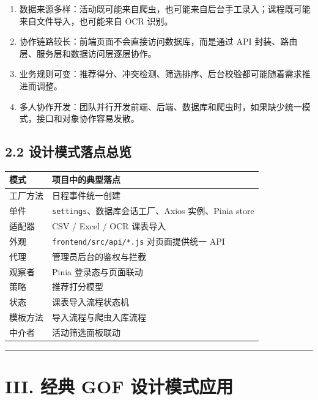 \begin{enumerate}
\def\labelenumi{\arabic{enumi}.}
\tightlist
\item
  数据来源多样：活动既可能来自爬虫，也可能来自后台手工录入；课程既可能来自文件导入，也可能来自
  OCR 识别。
\item
  协作链路较长：前端页面不会直接访问数据库，而是通过 API
  封装、路由层、服务层和数据访问层逐层协作。
\item
  业务规则可变：推荐得分、冲突检测、筛选排序、后台校验都可能随着需求推进而调整。
\item
  多人协作开发：团队并行开发前端、后端、数据库和爬虫时，如果缺少统一模式，接口和对象协作容易发散。
\end{enumerate}

\subsection{2.2
设计模式落点总览}\label{ux8bbeux8ba1ux6a21ux5f0fux843dux70b9ux603bux89c8}

{\def\LTcaptype{none} %
\begin{longtable}[]{@{}ll@{}}
\toprule\noalign{}
模式 & 项目中的典型落点 \\
\midrule\noalign{}
\endhead
\bottomrule\noalign{}
\endlastfoot
工厂方法 & 日程事件统一创建 \\
单件 & \passthrough{\lstinline!settings!}、数据库会话工厂、Axios
实例、Pinia store \\
适配器 & CSV / Excel / OCR 课表导入 \\
外观 & \passthrough{\lstinline!frontend/src/api/*.js!} 对页面提供统一
API \\
代理 & 管理员后台的鉴权与拦截 \\
观察者 & Pinia 登录态与页面联动 \\
策略 & 推荐打分模型 \\
状态 & 课表导入流程状态机 \\
模板方法 & 导入流程与爬虫入库流程 \\
中介者 & 活动筛选面板联动 \\
\end{longtable}
}

\begin{center}\rule{0.5\linewidth}{0.5pt}\end{center}

\section{III. 经典 GOF
设计模式应用}\label{iii.-ux7ecfux5178-gof-ux8bbeux8ba1ux6a21ux5f0fux5e94ux7528}

